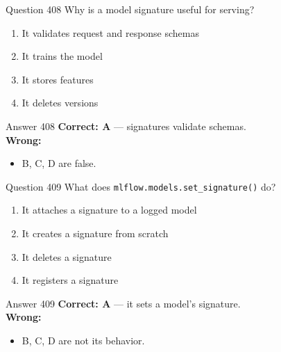 \documentclass[aspectratio=169,11pt]{beamer}
\begin{document}
	\begin{frame}{Question 408}
		Why is a model signature useful for serving?
		\begin{enumerate}[label=\Alph*.]
			\item It validates request and response schemas
			\item It trains the model
			\item It stores features
			\item It deletes versions
		\end{enumerate}
	\end{frame}
	\begin{frame}{Answer 408}
		\textbf{Correct: A} --- signatures validate schemas.\\
		\vspace{0.5em}
		\textbf{Wrong:}
		\begin{itemize}
			\item B, C, D are false.
		\end{itemize}
	\end{frame}
	
	\begin{frame}{Question 409}
		What does \texttt{mlflow.models.set\_signature()} do?
		\begin{enumerate}[label=\Alph*.]
			\item It attaches a signature to a logged model
			\item It creates a signature from scratch
			\item It deletes a signature
			\item It registers a signature
		\end{enumerate}
	\end{frame}
	\begin{frame}{Answer 409}
		\textbf{Correct: A} --- it sets a model's signature.\\
		\vspace{0.5em}
		\textbf{Wrong:}
		\begin{itemize}
			\item B, C, D are not its behavior.
		\end{itemize}
	\end{frame}
	
\end{document}

